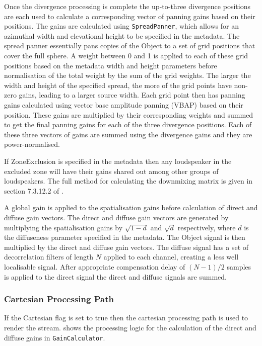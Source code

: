 \documentclass[12pt]{report}
\newcommand{\code}[1]{\texttt{#1}}
\begin{document}
Once the divergence processing is complete the up-to-three divergence positions are each used to calculate a corresponding vector of panning gains based on their positions.
The gains are calculated using \code{SpreadPanner}, which allows for an azimuthal width and elevational height to be specified in the metadata.
The spread panner essentially pans copies of the Object to a set of grid positions that cover the full sphere.
A weight between 0 and 1 is applied to each of these grid positions based on the metadata width and height parameters before normalisation of the total weight by the sum of the grid weights.
The larger the width and height of the specified spread, the more of the grid points have non-zero gains, leading to a larger source width.
Each grid point then has panning gains calculated using vector base amplitude panning (VBAP) \cite{Pulkki1997} based on their position.
These gains are multiplied by their corresponding weights and summed to get the final panning gains for each of the three divergence positions.
Each of these three vectors of gains are summed using the divergence gains and they are power-normalised.

If ZoneExclusion is specified in the metadata then any loudspeaker in the excluded zone will have their gains shared out among other groups of loudspeakers.
The full method for calculating the downmixing matrix is given in section 7.3.12.2 of \cite{ITU2127}.

A global gain is applied to the spatialisation gains before calculation of direct and diffuse gain vectors.
The direct and diffuse gain vectors are generated by multiplying the spatialisation gains by $\sqrt{1-d}$ and $\sqrt{d}$ respectively, where $d$ is the diffuseness parameter specified in the metadata.
The Object signal is then multiplied by the direct and diffuse gain vectors.
The diffuse signal has a set of decorrelation filters of length $N$ applied to each channel, creating a less well localisable signal.
After appropriate compensation delay of $(N-1)/2$ samples is applied to the direct signal the direct and diffuse signals are summed.

\subsubsection{Cartesian Processing Path}

If the Cartesian flag is set to true then the cartesian processing path is used to render the stream.
 shows the processing logic for the calculation of the direct and diffuse gains in \code{GainCalculator}.
\end{document}
